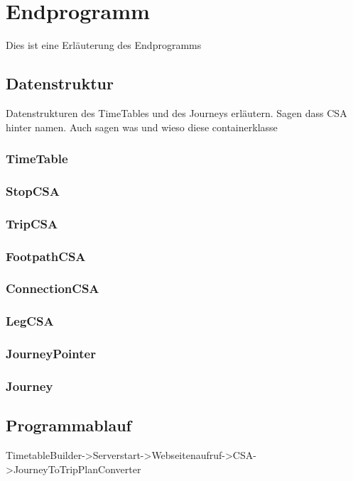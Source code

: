 \section{Endprogramm}
Dies ist eine Erläuterung des Endprogramms

\subsection{Datenstruktur}
Datenstrukturen des TimeTables und des Journeys erläutern. Sagen dass CSA hinter namen. Auch sagen was und wieso diese containerklasse
\subsubsection{TimeTable}

\subsubsection{StopCSA}

\subsubsection{TripCSA}

\subsubsection{FootpathCSA}

\subsubsection{ConnectionCSA}

\subsubsection{LegCSA}

\subsubsection{JourneyPointer}

\subsubsection{Journey}

\subsection{Programmablauf}
TimetableBuilder->Serverstart->Webseitenaufruf->CSA->JourneyToTripPlanConverter

